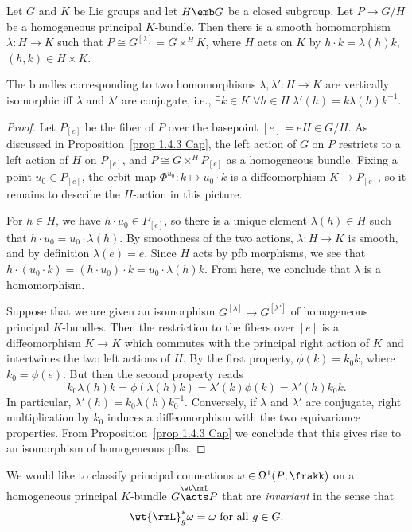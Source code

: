 \begin{lem}\label{lem 1.4.5 Cap}
    Let $G$ and $K$ be Lie groups and let $H\emb G$ be a closed subgroup. Let $P\to G\slash H$ be a homogeneous principal $K$-bundle. Then there is a smooth homomorphism $\lambda:H\to K$ such that $P\cong G^{[\lambda]}=G\times^H K$, where $H$ acts on $K$ by $h\cdot k=\lambda(h)k$, $(h,k)\in H\times K$.

    The bundles corresponding to two homomorphisms $\lambda,\lambda':H\to K$ are vertically isomorphic iff $\lambda$ and $\lambda'$ are conjugate, i.e., $\exists k\in K\;\forall h\in H \; \lambda'(h)=k\lambda(h)k^{-1}$.
\end{lem}
\begin{proof}
    Let $P_{[e]}$ be the fiber of $P$ over the basepoint $[e]=eH\in G\slash H$. As discussed in Proposition~\ref{prop 1.4.3 Cap}, the left action of $G$ on $P$ restricts to a left action of $H$ on $P_{[e]}$, and $P\cong G\times^H P_{[e]}$ as a homogeneous bundle. Fixing a point $u_0\in P_{[e]}$, the orbit map $\Phi^{u_0}:k\mapsto u_0\cdot k$ is a diffeomorphism $K\to P_{[e]}$, so it remains to describe the $H$-action in this picture.

    For $h\in H$, we have $h\cdot u_0\in P_{[e]}$, so there is a unique element $\lambda(h)\in H$ such that $h\cdot u_0=u_0\cdot\lambda(h)$. By smoothness of the two actions, $\lambda:H\to K$ is smooth, and by definition $\lambda(e)=e$. Since $H$ acts by \gls{pfb} morphisms, we see that $h\cdot(u_0\cdot k)=(h\cdot u_0)\cdot k=u_0\cdot \lambda(h)k$. From here, we conclude that $\lambda$ is a homomorphism.

    Suppose that we are given an isomorphism $G^{[\lambda]}\to G^{[\lambda']}$ of homogeneous principal $K$-bundles. Then the restriction to the fibers over $[e]$ is a diffeomorphism $K\to K$ which commutes with the principal right action of $K$ and intertwines the two left actions of $H$. By the first property, $\phi(k)=k_0k$, where $k_0=\phi(e)$. But then the second property reads 
    \[k_0\lambda(h)k=\phi(\lambda(h)k)=\lambda'(k)\phi(k)=\lambda'(h)k_0k.\]
    In particular, $\lambda'(h)=k_0\lambda(h)k_0^{-1}$. Conversely, if $\lambda$ and $\lambda'$ are conjugate, right multiplication by $k_0$ induces a diffeomorphism with the two equivariance properties. From Proposition~\ref{prop 1.4.3 Cap} we conclude that this gives rise to an isomorphism of homogeneous \glspl{pfb}.
\end{proof}

We would like to classify principal connections $\omega\in\Omega^1(P;\frakk)$ on a homogeneous principal $K$-bundle $G\overset{\wt\rmL}{\acts}P$ that are \emph{invariant} in the sense that 
\[\wt{\rmL}_g^\ast\omega=\omega \text{ for all }g\in G.\] 

